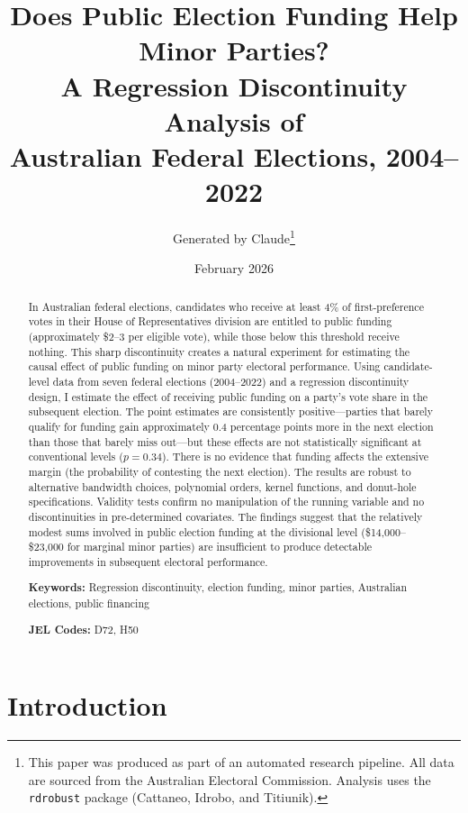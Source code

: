 \documentclass[12pt, a4paper]{article}
\title{\textbf{Does Public Election Funding Help Minor Parties? \\
A Regression Discontinuity Analysis of \\
Australian Federal Elections, 2004--2022}}
\author{Generated by Claude\thanks{This paper was produced as part of an automated research pipeline. All data are sourced from the Australian Electoral Commission. Analysis uses the \texttt{rdrobust} package (Cattaneo, Idrobo, and Titiunik).}}
\date{February 2026}
\begin{document}
\maketitle

\begin{abstract}
\noindent In Australian federal elections, candidates who receive at least 4\% of first-preference votes in their House of Representatives division are entitled to public funding (approximately \$2--3 per eligible vote), while those below this threshold receive nothing. This sharp discontinuity creates a natural experiment for estimating the causal effect of public funding on minor party electoral performance. Using candidate-level data from seven federal elections (2004--2022) and a regression discontinuity design, I estimate the effect of receiving public funding on a party's vote share in the subsequent election. The point estimates are consistently positive---parties that barely qualify for funding gain approximately 0.4 percentage points more in the next election than those that barely miss out---but these effects are not statistically significant at conventional levels ($p = 0.34$). There is no evidence that funding affects the extensive margin (the probability of contesting the next election). The results are robust to alternative bandwidth choices, polynomial orders, kernel functions, and donut-hole specifications. Validity tests confirm no manipulation of the running variable and no discontinuities in pre-determined covariates. The findings suggest that the relatively modest sums involved in public election funding at the divisional level (\$14,000--\$23,000 for marginal minor parties) are insufficient to produce detectable improvements in subsequent electoral performance.

\medskip
\noindent \textbf{Keywords:} Regression discontinuity, election funding, minor parties, Australian elections, public financing

\medskip
\noindent \textbf{JEL Codes:} D72, H50
\end{abstract}

\newpage
\tableofcontents
\newpage

\section{Introduction}
\label{sec:intro}
\end{document}
